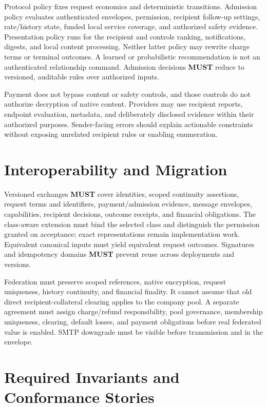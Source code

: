 \documentclass[11pt]{article}
\newcommand{\MUST}{\textbf{MUST}}
\begin{document}
Protocol policy fixes request economics and deterministic transitions. Admission
policy evaluates authenticated envelopes, permission, recipient follow-up
settings, rate/history state, funded local service coverage, and authorized safety
evidence. Presentation policy
runs for the recipient and controls ranking, notifications, digests, and local
content processing. Neither latter policy may rewrite charge terms or terminal
outcomes. A learned or probabilistic recommendation is not an authenticated
relationship command. Admission decisions \MUST{} reduce to versioned, auditable
rules over authorized inputs.

Payment does not bypass content or safety controls, and those controls do not
authorize decryption of native content. Providers may use recipient reports,
endpoint evaluation, metadata, and deliberately disclosed evidence within their
authorized purposes. Sender-facing errors should explain actionable constraints
without exposing unrelated recipient rules or enabling enumeration.

\section{Interoperability and Migration}

Versioned exchanges \MUST{} cover identities, scoped continuity assertions,
request terms and identifiers, payment/admission evidence, message envelopes,
capabilities, recipient decisions, outcome receipts, and financial obligations.
The class-aware extension must bind the selected class and distinguish the
permission granted on acceptance; exact representations remain implementation work.
Equivalent canonical inputs must yield equivalent request outcomes. Signatures
and idempotency domains \MUST{} prevent reuse across deployments and versions.

Federation must preserve scoped references, native encryption, request uniqueness,
history continuity, and financial finality. It cannot assume that old direct
recipient-collateral clearing applies to the company pool. A separate agreement
must assign charge/refund responsibility, pool governance, membership uniqueness,
clearing, default losses, and payment obligations before real federated value is
enabled. SMTP downgrade must be visible before transmission and in the envelope.

\section{Required Invariants and Conformance Stories}
\end{document}
